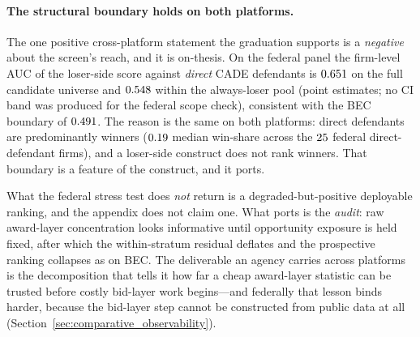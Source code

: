 \paragraph{The structural boundary holds on both platforms.}
The one positive cross-platform statement the graduation supports is a
\emph{negative} about the screen's reach, and it is on-thesis. On the
federal panel the firm-level AUC of the loser-side score against
\emph{direct} CADE defendants is $0.651$ on the full
candidate universe and $0.548$ within the
always-loser pool (point estimates; no CI band was produced for the
federal scope check), consistent with the BEC boundary of
$0.491$. The reason is the same on both platforms: direct
defendants are predominantly winners ($0.19$ median
win-share across the $25$ federal direct-defendant firms),
and a loser-side construct does not rank winners. That boundary is a
feature of the construct, and it ports.

What the federal stress test does \emph{not} return is a
degraded-but-positive deployable ranking, and the appendix does not claim
one. What ports is the \emph{audit}: raw award-layer concentration looks
informative until opportunity exposure is held fixed, after which the
within-stratum residual deflates and the prospective ranking collapses as
on BEC. The deliverable an agency carries across platforms is the
decomposition that tells it how far a cheap award-layer statistic can be
trusted before costly bid-layer work begins---and federally that lesson
binds harder, because the bid-layer step cannot be constructed from public
data at all (Section~\ref{sec:comparative_observability}).
